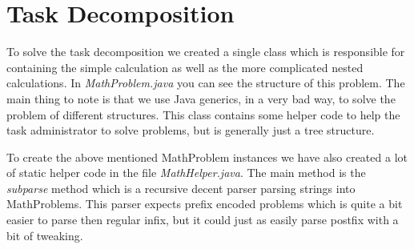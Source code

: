 \section{Task Decomposition}\label{sec:task-decomposition}
To solve the task decomposition we created a single class which is responsible
for containing the simple calculation as well as the more complicated nested
calculations. In \textit{MathProblem.java} you can see the structure of this
problem. The main thing to note is that we use Java generics, in a very bad way,
to solve the problem of different structures. This class contains some helper
code to help the task administrator to solve problems, but is generally just a
tree structure.

To create the above mentioned MathProblem instances we have also created a lot
of static helper code in the file \textit{MathHelper.java}. The main method is
the \textit{subparse} method which is a recursive decent parser parsing strings
into MathProblems. This parser expects prefix encoded problems which is quite a
bit easier to parse then regular infix, but it could just as easily parse
postfix with a bit of tweaking.
